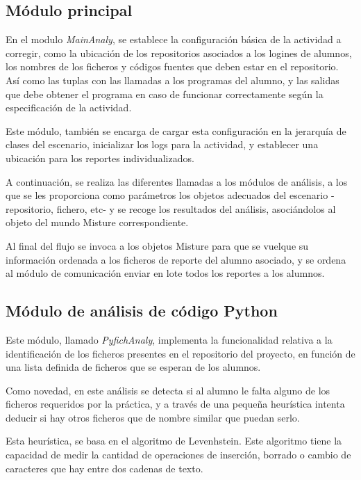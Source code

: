 \subsection{Módulo principal}

En el modulo \textit{MainAnaly}, se establece la configuración básica de la actividad a corregir, como la ubicación de los repositorios asociados a los logines de alumnos, los nombres de los ficheros y códigos fuentes que deben estar en el repositorio. Así como las tuplas con las llamadas a los programas del alumno, y las salidas que debe obtener el programa en caso de funcionar correctamente según la especificación de la actividad.


Este módulo, también se encarga de cargar esta configuración en la jerarquía de clases del escenario, inicializar los logs para la actividad, y establecer una ubicación para los reportes individualizados.


A continuación, se realiza las diferentes llamadas a los módulos de análisis, a los que se les proporciona como parámetros los objetos adecuados del escenario -repositorio, fichero, etc- y se recoge los resultados del análisis, asociándolos al objeto del mundo Misture correspondiente.

Al final del flujo se invoca a los objetos Misture para que se vuelque su información ordenada a los ficheros de reporte del alumno asociado, y se ordena al módulo de comunicación enviar en lote todos los reportes a los alumnos.

\subsection{Módulo de análisis de código Python}

Este módulo, llamado \textit{PyfichAnaly}, implementa la funcionalidad relativa a la identificación de los ficheros presentes en el repositorio del proyecto, en función de una lista definida de ficheros que se esperan de los alumnos.


Como novedad, en este análisis se detecta si al alumno le falta alguno de los ficheros requeridos por la práctica, y a través de una pequeña heurística intenta deducir si hay otros ficheros que de nombre similar que puedan serlo.


Esta heurística, se basa en el algoritmo de Levenhstein. Este algoritmo tiene la capacidad de medir la cantidad de operaciones de inserción, borrado o cambio de caracteres que hay entre dos cadenas de texto.


